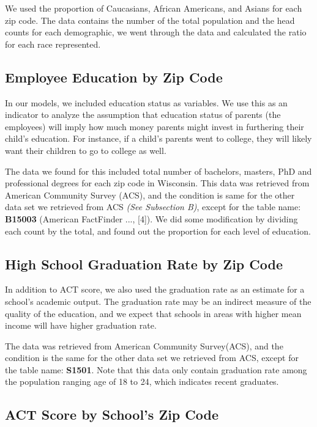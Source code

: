 \documentclass[letterpaper, 10 pt, conference]{ieeeconf}  %
\begin{document}
We used the proportion of Caucasians, African Americans, and Asians for each zip code. The data contains the number of the total population and the head counts for each demographic, we went through the data and calculated the ratio for each race represented.

\subsection{Employee Education by Zip Code}

In our models, we included education status as variables.
We use this as an indicator to analyze the assumption that education status of parents (the employees) will imply how much money parents might invest in furthering their child’s education.
For instance, if a child’s parents went to college, they will likely want their children to go to college as well.

The data we found for this included total number of bachelors, masters, PhD and professional degrees for each zip code in Wisconsin.
This data was retrieved from American Community Survey (ACS), and the condition is same for the other data set we retrieved from ACS \textit{(See Subsection B)}, except for the table name: \textbf{B15003} (American FactFinder ..., [4]).
We did some modification by dividing each count by the total, and found out the proportion for each level of education.

\subsection{High School Graduation Rate by Zip Code}

In addition to ACT score, we also used the graduation rate as an estimate for a school’s academic output.
The graduation rate may be an indirect measure of the quality of the education, and we expect that schools in areas with higher mean income will have higher graduation rate. 

The data was retrieved from American Community Survey(ACS), and the condition is the same for the other data set we retrieved from ACS, except for the table name: \textbf{S1501}.
Note that this data only contain graduation rate among the population ranging age of 18 to 24, which indicates recent graduates.

\subsection{ACT Score by School's Zip Code}
\end{document}
